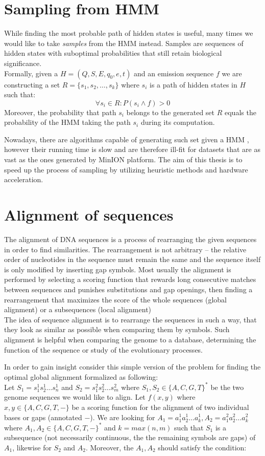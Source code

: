 \section{Sampling from HMM}
While finding the most probable path of hidden states is useful, many times we would like to take \emph{samples} from the HMM instead. Samples are sequences of hidden states with suboptimal probabilities that still retain biological significance.\\
Formally, given a $H = (Q,S,E,q_0,e,t)$ and an emission sequence $f$ we are constructing a set $R = \{s_1, s_2, \dots, s_k\}$ where $s_i$ is a path of hidden states in $H$ such that:
$$\forall s_i \in R: P(s_i \land f) > 0$$
Moreover, the probability that path $s_i$ belongs to the generated set $R$ equals the probability of the HMM taking the path $s_i$ during its computation.

Nowadays, there are algorithms capable of generating such set given a HMM \cite{cawley2003hmm}, however their running time is slow and are therefore ill-fit for datasets that are as vast as the ones generated by MinION platform.
The aim of this thesis is to speed up the process of sampling by utilizing heuristic methods and hardware acceleration.

\section{Alignment of sequences}

The alignment of DNA sequences is a process of rearranging the given sequences in order to find similarities. The rearrangement is not arbitrary -- the relative order of nucleotides in the sequence must remain the same and the sequence itself is only modified by inserting gap symbols.
Most usually the alignment is performed by selecting a scoring function that rewards long consecutive matches between sequences and punishes substitutions and gap openings, then finding a rearrangement that maximizes the score of the whole sequences (global alignment) or a subsequences (local alignment)\\
The idea of sequence alignment is to rearrange the sequences in such a way, that they look as similar as possible when comparing them by symbols. Such alignment is helpful when comparing the genome to a database, determining the function of the sequence or study of the evolutionary processes.

In order to gain insight consider this simple version of the problem for finding the optimal global alignment formalized as following:\\
Let $S_1 = s_1^1s_2^1\dots s_n^1$ and $S_2 = s_1^2s_2^2 \dots s_m^2$ where $S_1, S_2 \in \{A,C,G,T\}^*$ be the two genome sequences we would like to align. Let $f(x,y)$ where $x,y \in \{A,C,G,T,-\}$ be a scoring function for the alignment of two individual bases or gaps (annotated $-$). We are looking for $A_1 = a_1^1a_2^1 \dots a_k^1, A_2  = a_1^2a_2^2 \dots a_k^2$ where $A_1, A_2\in \{A,C,G,T,-\}^*$ and $k = max(n,m)$ such that $S_1$ is a subsequence (not necessarily continuous, the the remaining symbols are gaps) of $A_1$, likewise for $S_2$ and $A_2$.
Moreover, the $A_1, A_2$ should satisfy the condition:

